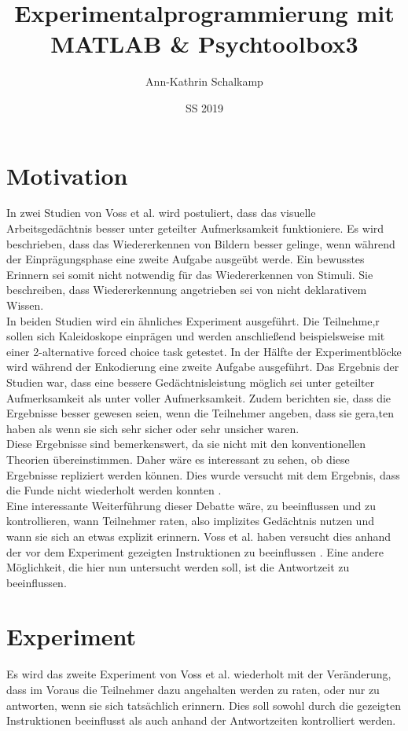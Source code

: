 \documentclass{article}
\title{Experimentalprogrammierung mit MATLAB \& Psychtoolbox3}
\author{Ann-Kathrin Schalkamp}
\date{SS 2019}
\begin{document}
\maketitle

\section{Motivation}
In zwei Studien von Voss et al. \cite{voss2008accurate,voss2009electrophysiological} wird postuliert, dass das visuelle Arbeitsgedächtnis besser unter geteilter Aufmerksamkeit funktioniere. Es wird beschrieben, dass das Wiedererkennen von Bildern besser gelinge, wenn während der Einprägungsphase eine zweite Aufgabe ausgeübt werde. Ein bewusstes Erinnern sei somit nicht notwendig für das Wiedererkennen von Stimuli. Sie beschreiben, dass Wiedererkennung angetrieben sei von nicht deklarativem Wissen.\\
In beiden Studien wird ein ähnliches Experiment ausgeführt. Die Teilnehme,r sollen sich Kaleidoskope einprägen und werden anschließend beispielsweise mit einer 2-alternative forced choice task getestet. In der Hälfte der Experimentblöcke wird während der Enkodierung eine zweite Aufgabe ausgeführt. Das Ergebnis der Studien war, dass eine bessere Gedächtnisleistung möglich sei unter geteilter Aufmerksamkeit als unter voller Aufmerksamkeit. Zudem berichten sie, dass die Ergebnisse besser gewesen seien, wenn die Teilnehmer angeben, dass sie gera,ten haben als wenn sie sich sehr sicher oder sehr unsicher waren.\\
Diese Ergebnisse sind bemerkenswert, da sie nicht mit den konventionellen Theorien übereinstimmen. Daher wäre es interessant zu sehen, ob diese Ergebnisse repliziert werden können. Dies wurde versucht mit dem Ergebnis, dass die Funde nicht wiederholt werden konnten \cite{jeneson2010recognition}. \\
Eine interessante Weiterführung dieser Debatte wäre, zu beeinflussen und zu kontrollieren, wann Teilnehmer raten, also implizites Gedächtnis nutzen und wann sie sich an etwas explizit erinnern. Voss et al. haben versucht dies anhand der vor dem Experiment gezeigten Instruktionen zu beeinflussen \cite{voss2010makes}. Eine andere Möglichkeit, die hier nun untersucht werden soll, ist die Antwortzeit zu beeinflussen.
\newpage
\section{Experiment}
Es wird das zweite Experiment von Voss et al. \cite{voss2008accurate} wiederholt mit der Veränderung, dass im Voraus die Teilnehmer dazu angehalten werden zu raten, oder nur zu antworten, wenn sie sich tatsächlich erinnern. Dies soll sowohl durch die gezeigten Instruktionen beeinflusst als auch anhand der Antwortzeiten kontrolliert werden.\\
\end{document}
